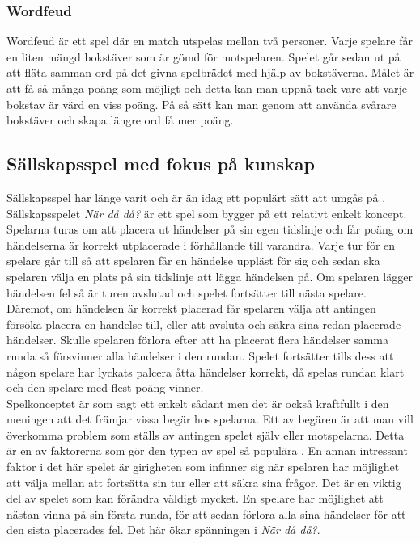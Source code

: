 \documentclass[a4paper, 11pt]{article}
\begin{document}
\subsubsection{Wordfeud}
Wordfeud \cite{aboutwordfeud} är ett spel där en match utspelas mellan två personer. Varje spelare får en liten mängd bokstäver som är gömd för motspelaren. Spelet går sedan ut på att fläta samman ord på det givna spelbrädet med hjälp av bokstäverna. Målet är att få så många poäng som möjligt och detta kan man uppnå tack vare att varje bokstav är värd en viss poäng. På så sätt kan man genom att använda svårare bokstäver och skapa längre ord få mer poäng. 

\subsection{Sällskapsspel med fokus på kunskap}
Sällskapsspel har länge varit och är än idag ett populärt sätt att umgås på \cite{bradspelspop}. Sällskapsspelet \textit{När då då?} \cite{nardada} är ett spel som bygger på ett relativt enkelt koncept. Spelarna turas om att placera ut händelser på sin egen tidslinje och får poäng om händelserna är korrekt utplacerade i förhållande till varandra. Varje tur för en spelare går till så att spelaren får en händelse uppläst för sig och sedan ska spelaren välja en plats på sin tidslinje att lägga händelsen på. Om spelaren lägger händelsen fel så är turen avslutad och spelet fortsätter till nästa spelare. Däremot, om händelsen är korrekt placerad får spelaren välja att antingen försöka placera en händelse till, eller att avsluta och säkra sina redan placerade händelser. Skulle spelaren förlora efter att ha placerat flera händelser samma runda så försvinner alla händelser i den rundan. Spelet fortsätter tills dess att någon spelare har lyckats palcera åtta händelser korrekt, då spelas rundan klart och den spelare med flest poäng vinner.\\
Spelkonceptet är som sagt ett enkelt sådant men det är också kraftfullt i den meningen att det främjar vissa begär hos spelarna. Ett av begären är att man vill överkomma problem som ställs av antingen spelet själv eller motspelarna. Detta är en av faktorerna som gör den typen av spel så populära \cite{psykologi}. En annan intressant faktor i det här spelet är girigheten som infinner sig när spelaren har möjlighet att välja mellan att fortsätta sin tur eller att säkra sina frågor. Det är en viktig del av spelet som kan förändra väldigt mycket. En spelare har möjlighet att nästan vinna på sin första runda, för att sedan förlora alla sina händelser för att den sista placerades fel. Det här ökar spänningen i \textit{När då då?}. 
\end{document}
